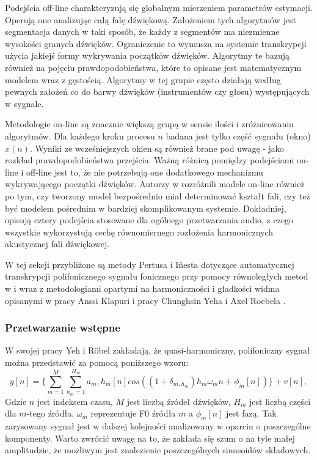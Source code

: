 \documentclass[12pt,a4paper,twoside]{mwart}
\begin{document}
Podejścia off-line charakteryzują się globalnym mierzeniem parametrów estymacji. Operują one analizując całą falę dźwiękową. Założeniem tych algorytmów jest segmentacja danych w taki sposób, że każdy z segmentów ma niezmienne wysokości granych dźwięków. Ograniczenie to wymusza na systemie transkrypcji użycia jakiejś formy wykrywania początków dźwięków. Algorytmy te bazują również na pojęciu prawdopodobieństwa, które to opisane jest matematycznym modelem wraz z gęstością. Algorytmy w tej grupie często działają według pewnych założeń co do barwy dźwięków (instrumentów czy głosu) występujących w sygnale.

Metodologie on-line są znacznie większą grupą w sensie ilości i zróżnicowaniu algorytmów. Dla każdego kroku procesu $n$ badana jest tylko część sygnału (okno) $x(n)$. Wyniki ze wcześniejszych okien są również brane pod uwagę - jako rozkład prawdopodobieństwa przejścia. Ważną różnicą pomiędzy podejściami on-line i off-line jest to, że nie potrzebują one dodatkowego mechanizmu wykrywającego początki dźwięków. Autorzy w \cite[203-227]{Transcription:Anssi:SignalProcessingMethods} rozróżnili modele on-line również po tym, czy tworzony model bezpośrednio miał determinować kształt fali, czy też być modelem pośrednim w bardziej skomplikowanym systemie. Dokładniej, opisują cztery podejścia stosowane dla ogólnego przetwarzania audio, z czego wszystkie wykorzystują cechę równomiernego rozłożenia harmonicznych akustycznej fali dźwiękowej.

W tej sekcji przybliżone są metody Pertusa i Iñesta dotyczące automatycznej transkrypcji polifonicznego sygnału fonicznego przy pomocy równoległych metod w \cite{Transcription:Pertus:Inharmonicity} i \cite{Transcription:Pertus:Inharmonicity2} wraz z metodologiami opartymi na harmoniczności i gładkości widma opisanymi w pracy Anssi Klapuri \cite{Transcription:Klapuri:MultipleFundamentalFrequencyEstimation} i pracy Chunghsin Yeha i Axel Roebela \cite{Transcription:Yeh:JointEvaluationF0}.

\subsubsection{Przetwarzanie wstępne}\label{sec:preProcessing} 
W swojej pracy \cite[1]{Transcription:Yeh:JointEvaluationF0} Yeh i Röbel zakładają, że quasi-harmoniczny, polifoniczny sygnał można przedstawić za pomocą poniższego wzoru:
\begin{equation}\label{eq:Yeh:signal}
y[n] = \{ \sum_{m=1}^{M}\sum_{h_m = 1}^{H_m}a_m,h_m[n]cos((1 + \delta_{m,h_m})h_m\omega_m n + \phi_m [n])\} + v[n],
\end{equation}
Gdzie $n$ jest indeksem czasu, $M$ jest liczbą źródeł dźwięków, $H_m$ jest liczbą części dla $m$-tego źródła, $\omega_m$ reprezentuje F0 źródła $m$ a $\phi_m[n]$ jest fazą. Tak zarysowany sygnał jest w dalszej kolejności analizowany w oparciu o poszczególne komponenty. Warto zwrócić uwagę na to, że zakłada się szum o na tyle małej amplitudzie, że możliwym jest znalezienie poszczególnych sinusoidów składowych.
\end{document}
